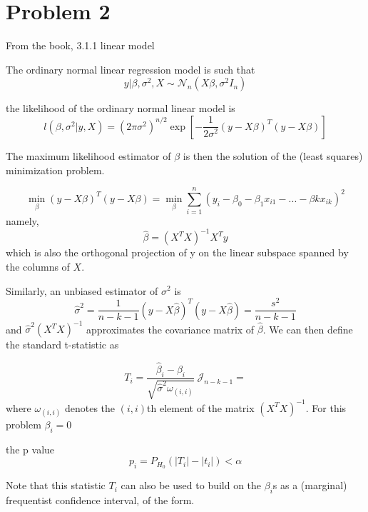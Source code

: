 \documentclass{article}
\begin{document}
\section{Problem 2}
From the book, 3.1.1 linear model

The ordinary normal linear regression model is such that 
\begin{equation}
    y|\beta,\sigma^{2},X \sim \mathcal{N}_{n}(X\beta,\sigma^{2}I_{n})
\end{equation}

the likelihood of the ordinary normal linear model is
\begin{equation}
    l(\beta,\sigma^{2}|y,X) = (2\pi\sigma^{2})^{n/2} \exp\left[-\frac{1}{2\sigma^2}(y-X\beta)^{T}(y-X\beta)\right]
\end{equation}

The maximum likelihood estimator of $\beta$ is then the solution of the (least squares) minimization problem.

\begin{equation}
\min_{\beta}(y-X\beta)^{T}(y-X\beta) = \min_{\beta}\sum_{i=1}^{n}(y_{i}-\beta_{0}-\beta_{1}x_{i1}-...-\beta{k}x_{ik})^2    
\end{equation}
namely,
\begin{equation}
\hat{\beta} = (X^{T} X)^{-1}X^{T}y    
\end{equation}
which is also the orthogonal projection of y on the linear subspace spanned by the columns of $X$.

Similarly, an unbiased estimator of $\sigma^{2}$ is
\begin{equation}
  \hat{\sigma}^2 = \frac{1}{n-k-1}(y-X\hat{\beta})^{T} (y-X\hat{\beta}) = \frac{s^{2}}{n-k-1}
\end{equation}
and $\hat{\sigma}^2(X^{T}X)^{-1}$ approximates the covariance matrix of $\hat{\beta}$. We can then define the standard t-statistic as 

\begin{equation}
    T_{i} = \frac{\hat{\beta}_{i}-\beta_{i}}{\sqrt{\hat{\sigma}^2\omega_{(i,i)}}} ~\mathcal{J}_{n-k-1} = 
\end{equation}
where $\omega_{(i,i)}$ denotes the $(i,i)$th element of the matrix $(X^{T}X)^{-1}$. For this problem $\beta_{i}=0$ 

the p value
\begin{equation}
    p_{i}= P_{H_{0}}(|T_{i}|-|t_{i}|) < \alpha
\end{equation}

Note that this statistic $T_{i}$ can also be used to build on the $\beta_{i}$s as a (marginal) frequentist confidence interval, of the form.
\end{document}

